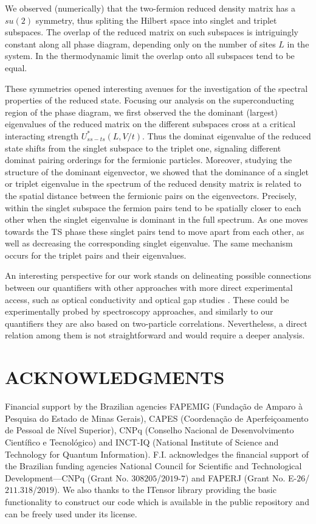 \documentclass[prb,reprint,showpacs,twocolumn,superscriptaddress]{revtex4-2}
\begin{document}
We observed (numerically) that the two-fermion reduced density matrix has a $su(2)$ symmetry, thus spliting the Hilbert space into singlet and triplet subspaces. The overlap of the reduced matrix on such subspaces is intriguingly constant along all phase diagram, depending only on the number of sites $L$ in the system. In the thermodynamic limit the overlap onto all subspaces tend to be equal.

These symmetries opened interesting avenues for the investigation of the spectral properties of the reduced state. Focusing our analysis on the superconducting region of the phase diagram, 
we first observed the the dominant (largest) eigenvalues of the reduced matrix on the different subspaces cross at a critical interacting strength $U_{ss-ts}^*(L,V/t)$. Thus the dominat eigenvalue of the reduced state shifts from the singlet subspace to the triplet one, signaling different dominat pairing orderings for the fermionic particles.
Moreover, studying the structure of the dominant eigenvector, we showed that the dominance of a singlet or triplet eigenvalue in the spectrum of the reduced density matrix is related to the spatial distance between the fermionic pairs on the eigenvectors.
 Precisely, within the singlet subspace the fermion pairs tend to be spatially closer to each other when the singlet eigenvalue is dominant in the full spectrum. As one moves towards the TS phase these singlet pairs tend to move apart from each other, as well as decreasing the corresponding singlet eigenvalue. The same mechanism occurs for the triplet pairs and their eigenvalues.
 
 An interesting perspective for our work stands on delineating possible connections between our quantifiers with other approaches with more direct experimental access, such as optical conductivity and optical gap studies  \cite{jeckelmann02,Kancharla2001}. These could be experimentally probed by spectroscopy approaches, and similarly to our quantifiers they are also based on two-particle correlations. Nevertheless, a direct relation among them is not straightforward and would require a deeper analysis.
 
\section*{ACKNOWLEDGMENTS}
Financial support by the Brazilian agencies FAPEMIG (Fundação de Amparo à Pesquisa do Estado de Minas Gerais), CAPES (Coordenação de Aperfeiçoamento de Pessoal de Nível Superior),  CNPq (Conselho Nacional de Desenvolvimento Científico e Tecnológico) and INCT-IQ (National Institute of Science and Technology for Quantum Information).
F.I. acknowledges the financial support of the Brazilian funding agencies National Council
for Scientific and Technological Development—CNPq (Grant No. $308205$/$2019$-$7$) and FAPERJ (Grant No. E-$26$/$211.318$/$2019$).
 We also thanks to the ITensor library \cite{itensorLib} providing the basic functionality to construct our code 
which is available in the public repository \cite{myrepo} and can be freely used under its license.
\end{document}
